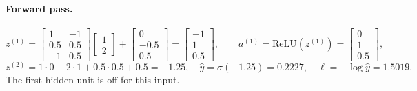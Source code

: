 \begin{notechapter}
\paragraph{Forward pass.}
\[
  z^{(1)} = \begin{bmatrix} 1 & -1\\ 0.5 & 0.5\\ -1 & 0.5\end{bmatrix}\begin{bmatrix}1\\2\end{bmatrix} + \begin{bmatrix} 0\\ -0.5\\ 0.5\end{bmatrix}
  = \begin{bmatrix} -1\\ 1\\ 0.5\end{bmatrix},\qquad
  a^{(1)} = \mathrm{ReLU}(z^{(1)}) = \begin{bmatrix} 0\\ 1\\ 0.5\end{bmatrix},
\]
\[
  z^{(2)} = 1\cdot0 - 2\cdot1 + 0.5\cdot0.5 + 0.5 = -1.25,\quad\hat y = \sigma(-1.25) = 0.2227,\quad
  \ell = -\log\hat y = 1.5019 .
\]
The first hidden unit is off for this input.


\end{notechapter}
